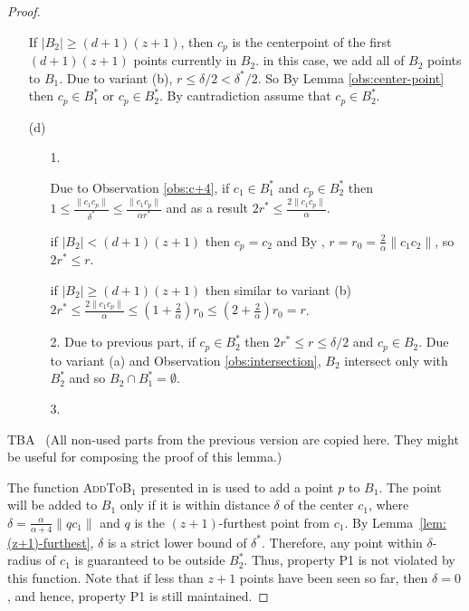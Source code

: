 \documentclass[envcountsame]{cls/cccg15}
\newcommand{\dz}{(d + 1)(z + 1)}
\newcommand{\textproc}{\textsc}
\newcommand{\len}[1]{\|{#1}\|}
\newcommand{\lee}{\leqslant}
\newcommand{\gee}{\geqslant}
\renewcommand{\leq}{\lee}
\renewcommand{\geq}{\gee}
\renewcommand{\ge}{\gee}
\begin{document}
\begin{proof}
\begin{enumerate}
{If $|B_2| \geq \dz$, then $c_p$ is the centerpoint of the first $\dz$ points currently in $B_2$. in this case, we add all of $B_2$ points to $B_1$. Due to variant (b), $r \leq \delta/2 < \delta^*/2$. So By Lemma \ref{obs:center-point} then $c_p \in B_1^*$ or $c_p \in B_2^*$. By cantradiction assume that $c_p \in B_2^*$.
}
\item [(d)] {
	\begin{enumerate}
		\item [1.]{
		Due to  Observation \ref{obs:c+4}, if $c_1 \in B_1^*$ and $c_p \in B_2^*$ then $1 \leq \frac{\len{c_1 c_p}}{\delta^*} \leq \frac{\len{c_1 c_p}}{\alpha r^*}$ and as a result $2r^* \leq \frac{2 \len{c_1c_p}}{\alpha}$.

	if $|B_2| < \dz$ then $c_p = c_2$ and By , $r = r_0 = \frac{2}{\alpha} \len{c_1 c_2}$, so $2r^* \leq r$.

	if $|B_2| \ge \dz$ then similar to variant (b) $2r^* \leq \frac{2 \len{c_1 c_p}}{\alpha} \leq (1 + \frac{2}{\alpha})r_0 \leq (2 + \frac{2}{\alpha})r_0 = r$.

}
		\item [2.]{ Due to previous part, if $c_p \in B_2^*$ then $2r^* \leq r \leq \delta /2$ and $c_p \in B_2$. Due to variant (a) and Observation \ref{obs:intersection}, $B_2$ intersect only with $B_2^*$ and so $B_2 \cap B_1^* = \emptyset$.
}
		\item [3.]{
}
	\end{enumerate}
}
\end{enumerate}



TBA \ 
(All non-used parts from the previous version are copied here.
They might be useful for composing the proof of this lemma.)

The function \textproc{AddToB$_1$} presented in  
is used to add a point $p$ to $B_1$. 
The point will be added to $B_1$ only if it is within distance $\delta$ of the center $c_1$, 
where $\delta = \frac{\alpha}{\alpha+4}\len{qc_1}$ 
and $q$ is the $(z+1)$-furthest point from $c_1$.
By Lemma~\ref{lem:(z+1)-furthest}, $\delta$ is a strict lower bound of $\delta^*$. 
Therefore, any point within $\delta$-radius of $c_1$ is guaranteed to be outside $B_2^*$. 
Thus, property P1 is not violated by this function.
Note that if less than $z+1$ points have been seen so far,
then $\delta = 0$, %
and hence, property P1 is still maintained.



\end{proof}
\end{document}
